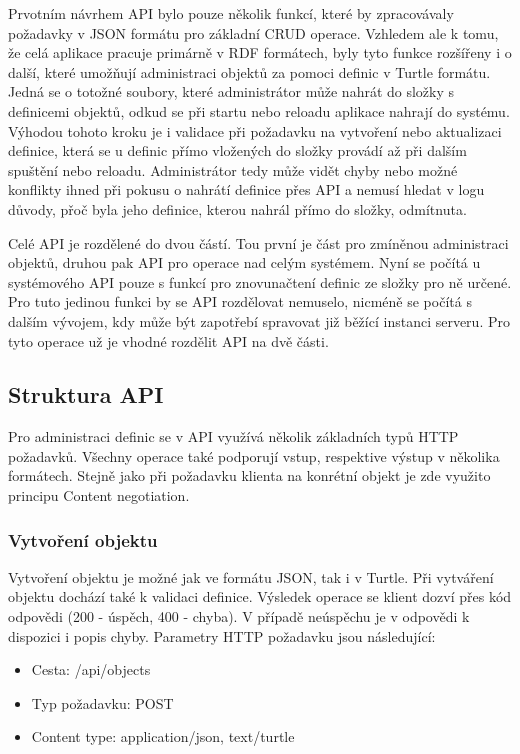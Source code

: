 \documentclass[thesis=B,czech]{FITthesis}[2012/06/26]
\begin{document}
  Prvotním návrhem API bylo pouze několik funkcí, které by zpracovávaly požadavky v JSON formátu pro základní CRUD
  operace. Vzhledem ale k tomu, že celá aplikace pracuje primárně v RDF formátech, byly tyto funkce rozšířeny i o další, které umožňují administraci
  objektů za pomoci definic v Turtle formátu. Jedná se o totožné soubory, které administrátor může nahrát do složky s definicemi objektů, odkud se 
  při startu nebo reloadu aplikace nahrají do systému. Výhodou tohoto kroku je i validace při požadavku na vytvoření nebo aktualizaci definice,
  která se u definic přímo vložených do složky provádí až při dalším spuštění nebo reloadu. Administrátor tedy může vidět chyby nebo možné konflikty
  ihned při pokusu o nahrátí definice přes API a nemusí hledat v logu důvody, přoč byla jeho definice, kterou nahrál přímo do složky, odmítnuta.
  
  Celé API je rozdělené do dvou částí. Tou první je část pro zmíněnou administraci objektů, druhou pak API pro operace nad celým systémem.
  Nyní se počítá u systémového API pouze s funkcí pro znovunačtení definic ze složky pro ně určené. Pro tuto jedinou funkci by se API rozdělovat nemuselo,
  nicméně se počítá s dalším vývojem, kdy může být zapotřebí spravovat již běžící instanci serveru. Pro tyto operace už je vhodné rozdělit API na dvě části.
  
  \subsection{Struktura API}
  Pro administraci definic se v API využívá několik základních typů HTTP požadavků. Všechny operace také podporují vstup, respektive výstup v několika
  formátech. Stejně jako při požadavku klienta na konrétní objekt je zde využito principu Content negotiation.
  
  \subsubsection{Vytvoření objektu}
  Vytvoření objektu je možné jak ve formátu JSON, tak i v Turtle. Při vytváření objektu dochází také k validaci definice.
  Výsledek operace se klient dozví přes kód odpovědi (200 - úspěch, 400 - chyba). V případě neúspěchu je v odpovědi k dispozici i popis chyby.
  Parametry HTTP požadavku jsou následující:
  \begin{itemize}
   \item Cesta: /api/objects
   \item Typ požadavku: POST
   \item Content type: application/json, text/turtle
  \end{itemize}
  
\end{document}
